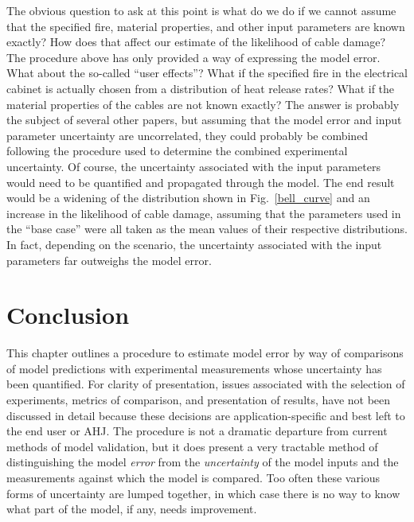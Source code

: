 The obvious question to ask at this point is what do we do if we cannot assume that the specified fire, material properties, and other input parameters are
known exactly? How does that affect our estimate of the likelihood of cable damage? The procedure above has only provided a way of expressing the model
error. What about the so-called ``user effects''? What if the specified fire in the electrical cabinet is actually chosen from a distribution of heat release rates?
What if the material properties of the cables are not known exactly? The answer is probably the subject of several other papers, but assuming that the model error
and input parameter uncertainty are uncorrelated, they could probably be combined following the procedure used to determine the combined experimental uncertainty. Of
course, the uncertainty associated with the input parameters would need to be quantified and propagated through the model. The end result would be a widening of
the distribution shown in Fig.~\ref{bell_curve} and an increase in the likelihood of cable damage, assuming that the parameters used in the ``base case'' were
all taken as the mean values of their respective distributions. In fact, depending on the scenario, the uncertainty associated with the input parameters far outweighs
the model error.


\section{Conclusion}

This chapter outlines a procedure to estimate model error by way of comparisons of model predictions with experimental measurements whose uncertainty has been
quantified. For clarity of presentation, issues associated with the selection of experiments, metrics of comparison, and presentation of results, have not been
discussed in detail because these decisions are application-specific and best left to the end user or AHJ. The procedure is not a dramatic departure from current
methods of model validation, but it does present a very tractable method of distinguishing the model {\em error} from the {\em uncertainty} of the model inputs and the measurements
against which the model is compared. Too often these various forms of uncertainty are lumped together, in which case there is no way to know what part of the model, if
any, needs improvement. 
